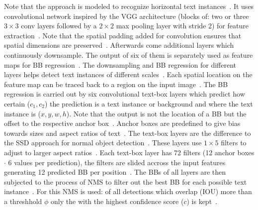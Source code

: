 Note that the approach is modeled to recognize horizontal text instances~\citep{liao_textboxes_2017}.
It uses convolutional network inspired by the VGG architecture (blocks of: two or
three $3\times3$ conv layers followed by a $2\times2$ max pooling layer with stride 2) for feature
extraction~\citep{liao_textboxes_2017,simonyan_very_2015}.
Note that the spatial padding added for convolution ensures that spatial dimensions are
preserved~\citep{simonyan_very_2015}.
Afterwards come additional layers which continuously downsample.
The output of six of them is separately used as feature maps for \ac{BB}
regression~\citep{liao_textboxes_2017}.
The downsampling and \ac{BB} regression for different layers helps detect text instances of different
scales~\citep{liu_ssd_2016}.
Each spatial location on the feature map can be traced back to a region on the input
image~\citep{long_scene_2021}.
The \ac{BB} regression is carried out by six convolutional text-box layers which predict how
certain ($c_1,c_2$) the prediction is a text instance or background and where the text instance
is ($x,y,w,h$).
Note that the output is not the location of a \ac{BB} but the offset to the
respective anchor box~\citep{liao_textboxes_2017,long_scene_2021}.
Anchor boxes are predefined to give bias towards sizes and aspect ratios of
text~\citep{liao_textboxes_2017}.
The text-box layers are the difference to the \ac{SSD} approach for normal object
detection~\citep{liao_textboxes_2017,liu_ssd_2016}.
These layers use $1\times5$ filters to adjust to larger aspect ratios~\citep{liao_textboxes_2017}.
Each text-box layer has 72 filters (12 anchor boxes $\cdot$ 6 values per prediction), the filters
are slided accross the input features generating 12 predicted \ac{BB} per
position~\citep{liao_textboxes_2017}.
The \acp{BB} of all layers are then subjected to the process of \ac{NMS} to filter out the best
\ac{BB} for each possible text instance~\citep{liao_textboxes_2017}.
For this \ac{NMS} is used: of all detections which overlap (\ac{IOU}) more than a threshhold
$\phi$ only the with the highest confidence score ($c$) is kept~\citep{hosang_learning_2017}.

